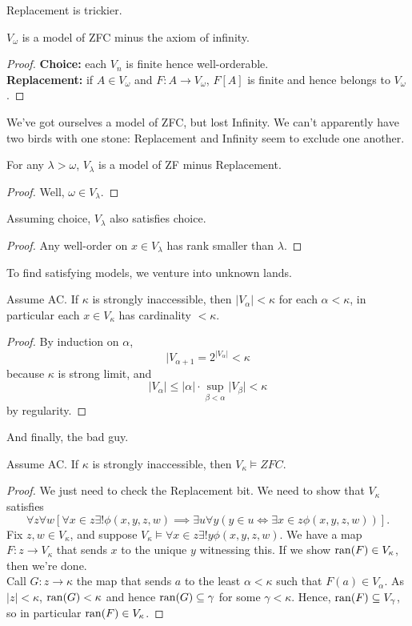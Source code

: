 \documentclass[twoside,openright,titlepage,numbers=noenddot,%
               headinclude,footinclude,cleardoublepage=empty,abstract=on,
               BCOR=23mm,paper=letter,fontsize=11pt
               ]{scrreprt}
\begin{document}
Replacement is trickier.
\begin{theorem}
    $V_\omega$ is a model of ZFC minus the axiom of infinity.
\end{theorem}
\begin{proof}
    \textbf{Choice:} each $V_n$ is finite hence well-orderable. \\
    \textbf{Replacement:} if $A \in V_\omega$ and $F: A \to V_\omega$, $F[A]$ is finite and hence belongs to $V_\omega$.
\end{proof}
We've got ourselves a model of ZFC, but lost Infinity. We can't apparently have two birds with one stone: Replacement and Infinity seem to exclude one another.
\begin{theorem}
    For any $\lambda > \omega$, $V_\lambda$ is a model of ZF minus Replacement.
\end{theorem}
\begin{proof}
    Well, $\omega \in V_\lambda$.
\end{proof}
\begin{theorem}
    Assuming choice, $V_\lambda$ also satisfies choice.
\end{theorem}
\begin{proof}
    Any well-order on $x \in V_\lambda$ has rank smaller than $\lambda$.
\end{proof}
To find satisfying models, we venture into unknown lands.
\begin{theorem}
    Assume AC. If $\kappa$ is strongly inaccessible, then $\vert V_\alpha \vert < \kappa$ for each $\alpha < \kappa$, in particular each $x \in V_\kappa$ has cardinality $< \kappa$.
\end{theorem}
\begin{proof}
    By induction on $\alpha$,
    \[ \vert V_{\alpha + 1} = 2^{\vert V_\alpha \vert} < \kappa \]
    because $\kappa$ is strong limit, and 
    \[ \vert V_\alpha \vert \leq \vert \alpha \vert \cdot \sup_{\beta < \alpha} \vert V_\beta \vert < \kappa \]
    by regularity.
\end{proof}
And finally, the bad guy.
\begin{theorem}
    Assume AC. If $\kappa$ is strongly inaccessible, then $V_\kappa \models ZFC$.
\end{theorem}
\begin{proof}
    We just need to check the Replacement bit. We need to show that $V_\kappa$ satisfies
    \[ \forall z \forall w [ \forall x \in z \exists ! \phi(x,y,z,w) \implies \exists u \forall y(y \in u \iff \exists x \in z \phi(x,y,z,w))]. \]
    Fix $z, w \in V_\kappa$, and suppose $V_\kappa \models \forall x \in z \exists ! y \phi(x,y,z,w)$. We have a map $F: z \to V_\kappa$ that sends $x$ to the unique $y$ witnessing this. If we show $\mathrm{ran}(F) \in V_\kappa$, then we're done. \\
    Call $G: z \to \kappa$ the map that sends $a$ to the least $\alpha < \kappa$ such that $F(a) \in V_\alpha$. As $\vert z \vert < \kappa$, $\mathrm{ran}(G) < \kappa$ and hence $\mathrm{ran}(G) \subseteq \gamma$ for some $\gamma < \kappa$. Hence, $\mathrm{ran}(F) \subseteq V_\gamma$, so in particular $\mathrm{ran}(F) \in V_\kappa$.
\end{proof}
\end{document}
